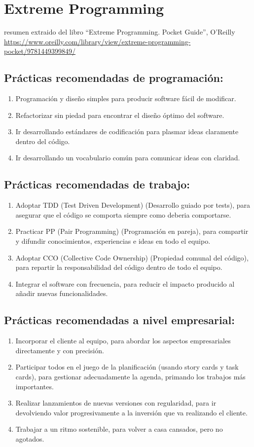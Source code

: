 \documentclass[spanish,12pt,a4paper,final,oneside]{book}
\begin{document}
\section*{Extreme Programming}
resumen extraido del libro ``Extreme Programming. Pocket Guide'', O’Reilly
\url{https://www.oreilly.com/library/view/extreme-programming-pocket/9781449399849/}

\subsection*{Prácticas recomendadas de programación:}
\begin{enumerate}
\item Programación y diseño simples
para producir software fácil de modificar.
\item Refactorizar sin piedad
para encontrar el diseño óptimo del software.
\item Ir desarrollando estándares de codificación
para plasmar ideas claramente dentro del código.
\item Ir desarrollando un vocabulario común
para comunicar ideas con claridad.
\end{enumerate}

\subsection*{Prácticas recomendadas de trabajo:}
\begin{enumerate}
\item Adoptar TDD (Test Driven Development) (Desarrollo guiado por tests),
para asegurar que el código se comporta siempre como deberia comportarse.
\item Practicar PP (Pair Programming) (Programación en pareja),
para compartir y difundir conocimientos, experiencias e ideas en todo el equipo.
\item Adoptar CCO (Collective Code Ownership) (Propiedad comunal del código),
para repartir la responsabilidad del código dentro de todo el equipo.
\item Integrar el software con frecuencia,
para reducir el impacto producido al añadir nuevas funcionalidades.
\end{enumerate}

\subsection*{Prácticas recomendadas a nivel empresarial:}
\begin{enumerate}
\item Incorporar el cliente al equipo,
para abordar los aspectos empresariales directamente y con precisión.
\item Participar todos en el juego de la planificación (usando story cards y task cards),
para gestionar adecuadamente la agenda, primando los trabajos más importantes.
\item Realizar lanzamientos de nuevas versiones con regularidad,
para ir devolviendo valor progresivamente a la inversión que va realizando el cliente.
\item Trabajar a un ritmo sostenible,
para volver a casa cansados, pero no agotados.
\end{enumerate}
\end{document}
